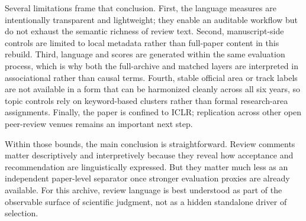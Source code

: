 \documentclass[9pt,twocolumn]{pnas-new}
\begin{document}
Several limitations frame that conclusion. First, the language measures are intentionally transparent and lightweight; they enable an auditable workflow but do not exhaust the semantic richness of review text. Second, manuscript-side controls are limited to local metadata rather than full-paper content in this rebuild. Third, language and scores are generated within the same evaluation process, which is why both the full-archive and matched layers are interpreted in associational rather than causal terms. Fourth, stable official area or track labels are not available in a form that can be harmonized cleanly across all six years, so topic controls rely on keyword-based clusters rather than formal research-area assignments. Finally, the paper is confined to ICLR; replication across other open peer-review venues remains an important next step.

Within those bounds, the main conclusion is straightforward. Review comments matter descriptively and interpretively because they reveal how acceptance and recommendation are linguistically expressed. But they matter much less as an independent paper-level separator once stronger evaluation proxies are already available. For this archive, review language is best understood as part of the observable surface of scientific judgment, not as a hidden standalone driver of selection.
\end{document}
